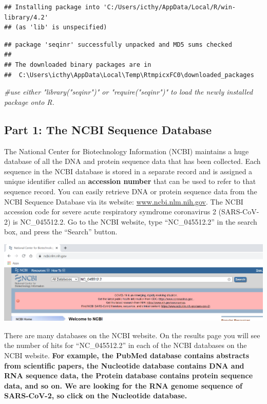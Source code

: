 \documentclass[
]{article}
\newenvironment{Shaded}{\begin{snugshade}}{\end{snugshade}}
\newcommand{\CommentTok}[1]{\textcolor[rgb]{0.56,0.35,0.01}{\textit{#1}}}
\begin{document}
\begin{verbatim}
## Installing package into 'C:/Users/icthy/AppData/Local/R/win-library/4.2'
## (as 'lib' is unspecified)
\end{verbatim}

\begin{verbatim}
## package 'seqinr' successfully unpacked and MD5 sums checked
## 
## The downloaded binary packages are in
##  C:\Users\icthy\AppData\Local\Temp\RtmpicxFC0\downloaded_packages
\end{verbatim}

\begin{Shaded}
\begin{Highlighting}[]
\CommentTok{\#use either "library("seqinr")" or "require("seqinr")" to load the newly installed package onto R.}
\end{Highlighting}
\end{Shaded}

\hypertarget{part-1-the-ncbi-sequence-database}{%
\subsection{Part 1: The NCBI Sequence
Database}\label{part-1-the-ncbi-sequence-database}}

The National Center for Biotechnology Information (NCBI) maintains a
huge database of all the DNA and protein sequence data that has been
collected. Each sequence in the NCBI database is stored in a separate
record and is assigned a unique identifier called an \textbf{accession
number} that can be used to refer to that sequence record. You can
easily retrieve DNA or protein sequence data from the NCBI Sequence
Database via its website: \url{www.ncbi.nlm.nih.gov}. The NCBI accession
code for severe acute respiratory symdrome coronavirus 2 (SARS-CoV-2) is
NC\_045512.2. Go to the NCBI website, type ``NC\_045512.2'' in the
search box, and press the ``Search'' button.

\includegraphics{./Images/img1.png}

There are many databases on the NCBI website. On the results page you
will see the number of hits for ``NC\_045512.2'' in each of the NCBI
databases on the NCBI website. \textbf{For example, the PubMed database
contains abstracts from scientific papers, the Nucleotide database
contains DNA and RNA sequence data, the Protein database contains
protein sequence data, and so on. We are looking for the RNA genome
sequence of SARS-CoV-2, so click on the Nucleotide database.}
\end{document}
